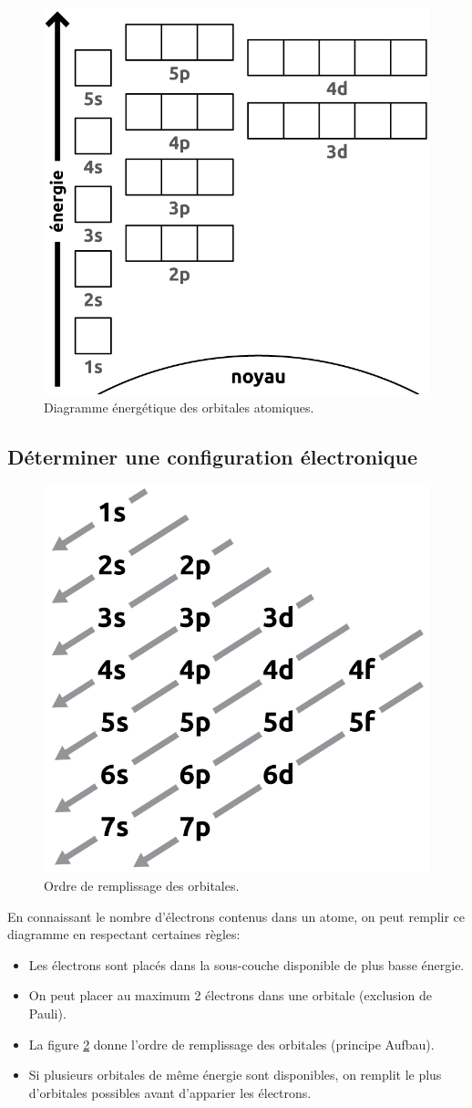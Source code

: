 \documentclass[
  11pt,
  a4paper,
  openany]{book}
\providecommand{\tightlist}{%
  \setlength{\itemsep}{0pt}\setlength{\parskip}{0pt}}
\begin{document}
\begin{figure}

{\centering \includegraphics[width=0.4\linewidth]{images/energy-level} 

}

\caption{Diagramme énergétique des orbitales atomiques.}\label{fig:energy-level}
\end{figure}

\newpage

\hypertarget{duxe9terminer-une-configuration-uxe9lectronique}{%
\subsection{Déterminer une configuration électronique}\label{duxe9terminer-une-configuration-uxe9lectronique}}

\begin{figure}

{\centering \includegraphics[width=0.25\linewidth]{images/energy-level-order} 

}

\caption{Ordre de remplissage des orbitales.}\label{fig:energy-level-order}
\end{figure}

En connaissant le nombre d'électrons contenus dans un atome, on peut remplir ce diagramme en respectant certaines règles:

\begin{itemize}
\tightlist
\item
  Les électrons sont placés dans la sous-couche disponible de plus basse énergie.
\item
  On peut placer au maximum 2 électrons dans une orbitale (exclusion de Pauli).
\item
  La figure \ref{fig:energy-level-order} donne l'ordre de remplissage des orbitales (principe Aufbau).
\item
  Si plusieurs orbitales de même énergie sont disponibles, on remplit le plus d'orbitales possibles avant d'apparier les électrons.
\end{itemize}
\end{document}
